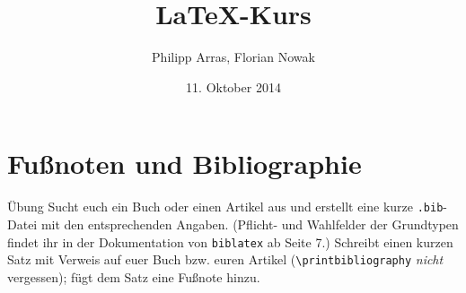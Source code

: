 \documentclass[11pt]{beamer}
\author{Philipp Arras, Florian Nowak}
\title{\LaTeX -Kurs}
\date{11. Oktober 2014}
\begin{document}


\section{Fußnoten und Bibliographie}
\begin{frame}[fragile]{Übung}
Sucht euch ein Buch oder einen Artikel aus und erstellt eine kurze \texttt{.bib}-Datei mit den entsprechenden Angaben. (Pflicht- und Wahlfelder der Grundtypen findet ihr in der Dokumentation von \texttt{biblatex} ab Seite 7.) Schreibt einen kurzen Satz mit Verweis auf euer Buch bzw. euren Artikel (\verb~\printbibliography~ \emph{nicht} vergessen); fügt dem Satz eine Fußnote hinzu.
\end{frame}
\end{document}
